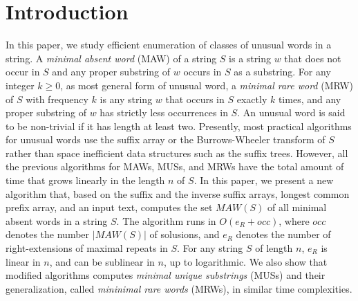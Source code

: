 
\section{Introduction}
\label{sec:intro}

  In this paper, we study efficient enumeration of classes of unusual words in a string.
  A \textit{minimal absent word} (MAW) of a string $S$ is a string $w$ that does not occur in $S$ and any proper substring of $w$ occurs in $S$ as a substring. For any integer $k\ge 0$, as most general form of unusual word, a \textit{minimal rare word} (MRW) of $S$ with frequency $k$ is any string $w$ that occurs in $S$ exactly $k$ times, and any proper substring of $w$ has strictly less occurrences in $S$. An unusual word is said to be non-trivial if it has length at least two.
Presently, most practical algorithms for unusual words use the suffix array or the Burrows-Wheeler transform of $S$ rather than space inefficient data structures such as the suffix trees. However, all the previous algorithms for MAWs, MUSs, and MRWs have the total amount of time that grows linearly in the length $n$ of $S$.
  In this paper, we present a new algorithm that, based on the suffix and the inverse suffix arrays, longest common prefix array, and an input text, computes the set $MAW(S)$ of all minimal absent words in a string $S$. The algorithm runs in $O(e_R + occ)$, where $occ$ denotes the number $|MAW(S)|$ of solusions, and  $e_R$ denotes the number of right-extensions of maximal repeats in $S$. For any string $S$ of length $n$, $e_R$ is linear in $n$, and can be sublinear in $n$, up to logarithmic.
  We also show that modified algorithms computes \textit{minimal unique substrings} (MUSs) and their generalization, called \textit{mininimal rare words} (MRWs), in similar time complexities. 


